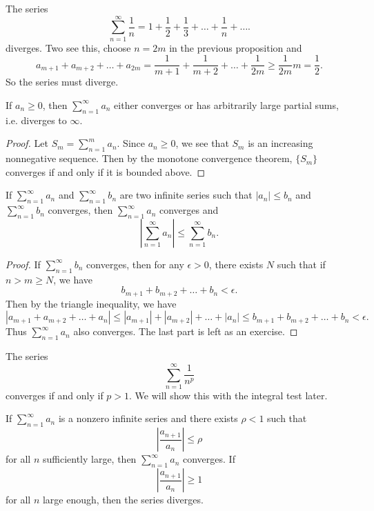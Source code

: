 \begin{example}
  The series
  \[
    \sum_{n = 1}^\infty \frac{1}{n} = 1 + \frac{1}{2} + \frac{1}{3} + \dots + \frac{1}{n} + \dots.
  \]
  diverges. Two see this, choose $n = 2m$ in the
  previous proposition and
  \[
    a_{m + 1} + a_{m + 2} + \dots + a_{2m}
    = \frac{1}{m + 1} + \frac{1}{m + 2} + \dots + \frac{1}{2m}
    \ge \frac{1}{2m} m = \frac{1}{2}.
  \]
  So the series must diverge.
\end{example}

\begin{prop}
  If $a_n \ge 0$, then
  $\sum_{n = 1}^\infty a_n$ either converges or
  has arbitrarily large partial sums, i.e. diverges to $\infty$.
\end{prop}

\begin{proof}
  Let $S_m = \sum_{n = 1}^m a_n$. Since $a_n \ge 0$,
  we see that $S_m$ is an increasing nonnegative sequence.
  Then by the monotone convergence theorem,
  $\{S_m\}$ converges if and only if it is bounded above.
\end{proof}

\begin{prop}
  If $\sum_{n = 1}^\infty a_n$ and $\sum_{n = 1}^\infty b_n$
  are two infinite series such that
  $|a_n| \le b_n$ and $\sum_{n = 1}^\infty b_n$ converges,
  then $\sum_{n = 1}^\infty a_n$ converges and
  \[
    \left| \sum_{n = 1}^\infty a_n \right| \le \sum_{n = 1}^\infty b_n.
  \]
\end{prop}

\begin{proof}
  If $\sum_{n = 1}^\infty b_n$ converges, then
  for any $\epsilon > 0$, there exists $N$ such that
  if $n > m \ge N$, we have
  \[
    b_{m + 1} + b_{m + 2} + \dots + b_n < \epsilon.
  \]
  Then by the triangle inequality, we have
  \[
    |a_{m + 1} + a_{m + 2} + \dots + a_n|
    \le |a_{m + 1}| + |a_{m + 2}| + \dots + |a_n|
    \le b_{m + 1} + b_{m + 2} + \dots + b_n < \epsilon.
  \]
  Thus $\sum_{n = 1}^\infty a_n$ also converges.
  The last part is left as an exercise.
\end{proof}

\begin{example}[$p$-series]
  The series
  \[
    \sum_{n = 1}^\infty \frac{1}{n^p}
  \]
  converges if and only if $p > 1$. We will show this
  with the integral test later.
\end{example}

\begin{prop}
  If $\sum_{n = 1}^\infty a_n$ is a nonzero infinite
  series and
  there exists $\rho < 1$ such that
  \[
    \left| \frac{a_{n + 1}}{a_n} \right| \le \rho
  \]
  for all $n$ sufficiently large, then
  $\sum_{n = 1}^\infty a_n$ converges. If
  \[
    \left| \frac{a_{n + 1}}{a_n} \right| \ge 1
  \]
  for all $n$ large enough, then the series diverges.
\end{prop}

